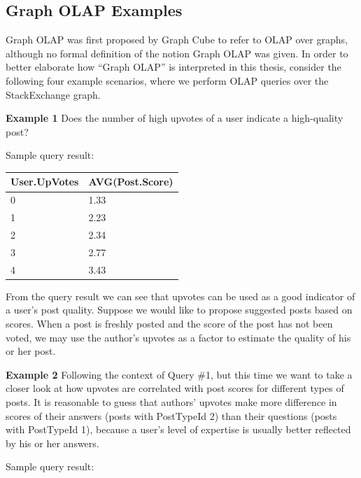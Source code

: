 \subsection{Graph OLAP Examples}
\label{OLAPExamples}
Graph OLAP was first proposed by Graph Cube \cite{DBLP:conf/sigmod/ZhaoLXH11} to refer to OLAP over graphs, although no formal definition of the notion Graph OLAP was given. In order to better elaborate how ``Graph OLAP'' is interpreted in this thesis, consider the following four example scenarios, where we perform OLAP queries over the StackExchange graph.

\noindent\textbf{Example 1} Does the number of high upvotes of a user indicate a high-quality post?


Sample query result:
\begin {center}
\begin{tabular}{ l l }
	User.UpVotes&AVG(Post.Score)\\\hline
	0&1.33\\
	1&2.23\\
	2&2.34\\
	3&2.77\\
	4&3.43\\\hline
\end{tabular}
\end {center}

From the query result we can see that upvotes can be used as a good indicator of a user's post quality. Suppose we would like to propose suggested posts based on scores. When a post is freshly posted and the score of the post has not been voted, we may use the author’s upvotes as a factor to estimate the quality of his or her post.

\noindent\textbf{Example 2} Following the context of Query \#1, but this time we want to take a closer look at how  upvotes are correlated with post scores for different types of posts. It is reasonable to guess that authors' upvotes make more difference in scores of their answers (posts with PostTypeId 2) than their questions (posts with PostTypeId 1), because a user's level of expertise is usually better reflected by his or her answers.


Sample query result:

